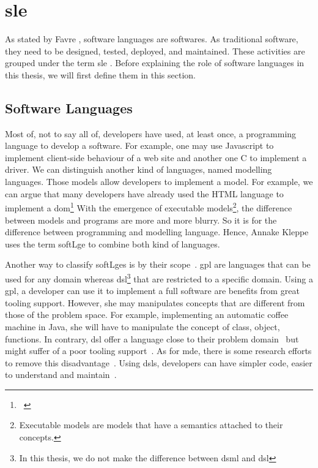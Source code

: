 \section[Software Language Engineering]{\glsdesc{sle}}

As stated by Favre \etal \cite{DBLP:conf/sle/FavreGLP10}, software languages are softwares.
As traditional software, they need to be designed, tested, deployed, and maintained.
These activities are grouped under the term \gls{sle} \cite{kleppe2008software}.
Before explaining the role of software languages in this thesis, we will first define them in this section.

\subsection{Software Languages}

Most of, not to say all of, developers have used, at least once, a programming language to develop a software.
For example, one may use Javascript to implement client-side behaviour of a web site and another one C to implement a driver.
We can distinguish another kind of languages, named modelling languages.
Those models allow developers to implement a model.
For example, we can argue that many developers have already used the HTML language to implement a \gls{dom}\footnote{~\cite{DOM:Spec}}
With the emergence of executable models\footnote{Executable models are models that have a semantics attached to their concepts.}, the difference between models and programs are more and more blurry.
So it is for the difference between programming and modelling language.
Hence, Annake Kleppe uses the term \gls{softLge} to combine both kind of languages.

Another way to classify \glspl{softLge} is by their scope~\cite{DBLP:journals/sigplan/DeursenKV00}.
\Gls{gpl} are languages that can be used for any domain whereas \gls{dsl}\footnote{In this thesis, we do not make the difference between \gls{dsml} and \gls{dsl}} that are restricted to a specific domain.
Using a \gls{gpl}, a developer can use it to implement a full software are benefits from great tooling support. 
However, she may manipulates concepts that are different from those of the problem space.
For example, implementing an automatic coffee machine in Java, she will have to manipulate the concept of class, object, functions.
In contrary, \gls{dsl} offer a language close to their problem domain~\cite{DBLP:journals/smr/DeursenK98} but might suffer of a poor tooling support~\cite{voelter2014generic}.
As for \gls{mde}, there is some research efforts to remove this disadvantage~\cite{DBLP:journals/jss/BousseLCWB18}. 
Using \glspl{dsl}, developers can have simpler code, easier to understand and maintain~\cite{DBLP:journals/sigplan/DeursenKV00, DBLP:journals/smr/DeursenK98}.

